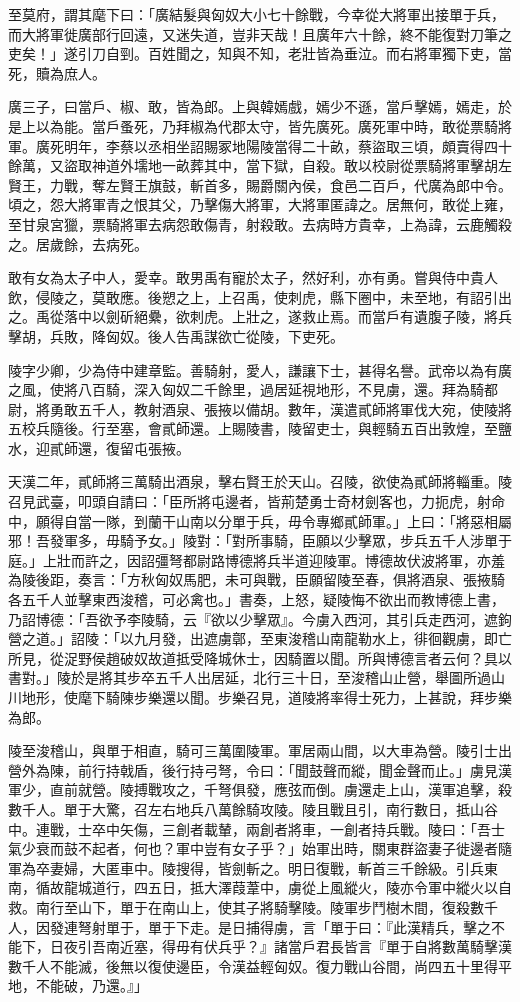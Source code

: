 \begin{pinyinscope}
至莫府，謂其麾下曰：「廣結髮與匈奴大小七十餘戰，今幸從大將軍出接單于兵，而大將軍徙廣部行回遠，又迷失道，豈非天哉！且廣年六十餘，終不能復對刀筆之吏矣！」遂引刀自剄。百姓聞之，知與不知，老壯皆為垂泣。而右將軍獨下吏，當死，贖為庶人。

廣三子，曰當戶、椒、敢，皆為郎。上與韓嫣戲，嫣少不遜，當戶擊嫣，嫣走，於是上以為能。當戶蚤死，乃拜椒為代郡太守，皆先廣死。廣死軍中時，敢從票騎將軍。廣死明年，李蔡以丞相坐詔賜冢地陽陵當得二十畝，蔡盜取三頃，頗賣得四十餘萬，又盜取神道外壖地一畝葬其中，當下獄，自殺。敢以校尉從票騎將軍擊胡左賢王，力戰，奪左賢王旗鼓，斬首多，賜爵關內侯，食邑二百戶，代廣為郎中令。頃之，怨大將軍青之恨其父，乃擊傷大將軍，大將軍匿諱之。居無何，敢從上雍，至甘泉宮獵，票騎將軍去病怨敢傷青，射殺敢。去病時方貴幸，上為諱，云鹿觸殺之。居歲餘，去病死。

敢有女為太子中人，愛幸。敢男禹有寵於太子，然好利，亦有勇。嘗與侍中貴人飲，侵陵之，莫敢應。後愬之上，上召禹，使刺虎，縣下圈中，未至地，有詔引出之。禹從落中以劍斫絕纍，欲刺虎。上壯之，遂救止焉。而當戶有遺腹子陵，將兵擊胡，兵敗，降匈奴。後人告禹謀欲亡從陵，下吏死。

陵字少卿，少為侍中建章監。善騎射，愛人，謙讓下士，甚得名譽。武帝以為有廣之風，使將八百騎，深入匈奴二千餘里，過居延視地形，不見虜，還。拜為騎都尉，將勇敢五千人，教射酒泉、張掖以備胡。數年，漢遣貳師將軍伐大宛，使陵將五校兵隨後。行至塞，會貳師還。上賜陵書，陵留吏士，與輕騎五百出敦煌，至鹽水，迎貳師還，復留屯張掖。

天漢二年，貳師將三萬騎出酒泉，擊右賢王於天山。召陵，欲使為貳師將輜重。陵召見武臺，叩頭自請曰：「臣所將屯邊者，皆荊楚勇士奇材劍客也，力扼虎，射命中，願得自當一隊，到蘭干山南以分單于兵，毋令專鄉貳師軍。」上曰：「將惡相屬邪！吾發軍多，毋騎予女。」陵對：「對所事騎，臣願以少擊眾，步兵五千人涉單于庭。」上壯而許之，因詔彊弩都尉路博德將兵半道迎陵軍。博德故伏波將軍，亦羞為陵後距，奏言：「方秋匈奴馬肥，未可與戰，臣願留陵至春，俱將酒泉、張掖騎各五千人並擊東西浚稽，可必禽也。」書奏，上怒，疑陵悔不欲出而教博德上書，乃詔博德：「吾欲予李陵騎，云『欲以少擊眾』。今虜入西河，其引兵走西河，遮鉤營之道。」詔陵：「以九月發，出遮虜鄣，至東浚稽山南龍勒水上，徘徊觀虜，即亡所見，從浞野侯趙破奴故道抵受降城休士，因騎置以聞。所與博德言者云何？具以書對。」陵於是將其步卒五千人出居延，北行三十日，至浚稽山止營，舉圖所過山川地形，使麾下騎陳步樂還以聞。步樂召見，道陵將率得士死力，上甚說，拜步樂為郎。

陵至浚稽山，與單于相直，騎可三萬圍陵軍。軍居兩山間，以大車為營。陵引士出營外為陳，前行持戟盾，後行持弓弩，令曰：「聞鼓聲而縱，聞金聲而止。」虜見漢軍少，直前就營。陵搏戰攻之，千弩俱發，應弦而倒。虜還走上山，漢軍追擊，殺數千人。單于大驚，召左右地兵八萬餘騎攻陵。陵且戰且引，南行數日，抵山谷中。連戰，士卒中矢傷，三創者載輦，兩創者將車，一創者持兵戰。陵曰：「吾士氣少衰而鼓不起者，何也？軍中豈有女子乎？」始軍出時，關東群盜妻子徙邊者隨軍為卒妻婦，大匿車中。陵搜得，皆劍斬之。明日復戰，斬首三千餘級。引兵東南，循故龍城道行，四五日，抵大澤葭葦中，虜從上風縱火，陵亦令軍中縱火以自救。南行至山下，單于在南山上，使其子將騎擊陵。陵軍步鬥樹木間，復殺數千人，因發連弩射單于，單于下走。是日捕得虜，言「單于曰：『此漢精兵，擊之不能下，日夜引吾南近塞，得毋有伏兵乎？』諸當戶君長皆言『單于自將數萬騎擊漢數千人不能滅，後無以復使邊臣，令漢益輕匈奴。復力戰山谷間，尚四五十里得平地，不能破，乃還。』」


\end{pinyinscope}
